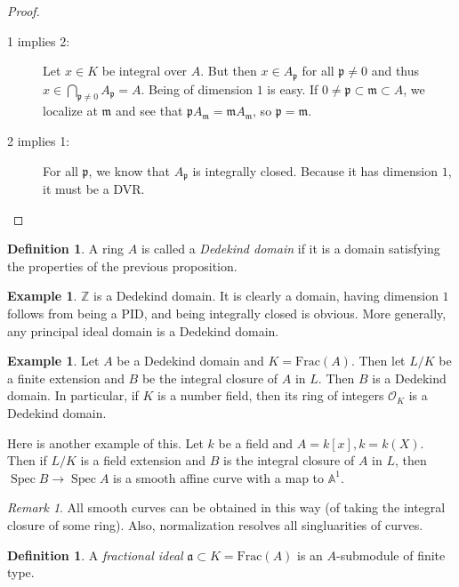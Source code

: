 \documentclass[leqno, openany]{memoir}
\theoremstyle{definition}
\newtheorem{defn}[thm]{Definition}
\newtheorem{exm}[thm]{Example}
\theoremstyle{remark}
\newtheorem{rmk}[thm]{Remark}
\theoremstyle{plain}
\theoremstyle{definition}
\theoremstyle{remark}
\newcommand{\A}{\mathbb{A}}
\newcommand{\Z}{\mathbb{Z}}
\newcommand{\mc}[1]{\mathcal{#1}}
\newcommand{\mf}[1]{\mathfrak{#1}}
\newcommand{\mr}[1]{\mathrm{#1}}
\DeclareMathOperator{\Spec}{Spec}
\begin{document}
\begin{proof} \begin{description} \item[1 implies 2:] Let $x \in K$ be integral
    over $A$. But then $x \in A_{\mf{p}}$ for all $\mf{p} \neq 0$ and thus $x
    \in \bigcap_{\mf{p} \neq 0} A_{\mf{p}} = A$. Being of dimension $1$ is
    easy. If $0 \neq \mf{p} \subset \mf{m} \subset A$, we localize at $\mf{m}$
    and see that $\mf{p} A_{\mf{m}} = \mf{m} A_{\mf{m}}$, so $\mf{p} = \mf{m}$.
    \item[2 implies 1:] For all $\mf{p}$, we know that $A_{\mf{p}}$ is
integrally closed. Because it has dimension $1$, it must be a DVR.
\end{description} \end{proof}

\begin{defn} A ring $A$ is called a \textit{Dedekind domain} if it is a domain
satisfying the properties of the previous proposition.  \end{defn}

\begin{exm} $\Z$ is a Dedekind domain. It is clearly a domain, having dimension
$1$ follows from being a PID, and being integrally closed is obvious. More
generally, any principal ideal domain is a Dedekind domain.  \end{exm}

\begin{exm} Let $A$ be a Dedekind domain and $K = \mr{Frac}(A)$. Then let $L/K$
    be a finite extension and $B$ be the integral closure of $A$ in $L$. Then
    $B$ is a Dedekind domain. In particular, if $K$ is a number field, then its
    ring of integers $\mc{O}_K$ is a Dedekind domain.

    Here is another example of this. Let $k$ be a field and $A =  k[x], k =
k(X)$. Then if $L/K$ is a field extension and $B$ is the integral closure of
$A$ in $L$, then $\Spec B \to \Spec A$ is a smooth affine curve with a map to
$\A^1$.  \end{exm}

\begin{rmk} All smooth curves can be obtained in this way (of taking the
integral closure of some ring). Also, normalization resolves all singluarities
of curves.  \end{rmk}

\begin{defn} A \textit{fractional ideal} $\mf{a} \subset K = \mr{Frac}(A)$ is
an $A$-submodule of finite type.  \end{defn}
\end{document}

